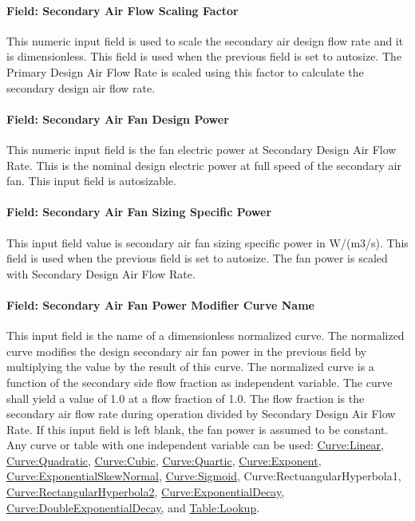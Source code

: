 \paragraph{Field: Secondary Air Flow Scaling Factor}\label{field-secondary-air-flow-scaling-factor}

This numeric input field is used to scale the secondary air design flow rate and it is dimensionless. This field is used when the previous field is set to autosize. The Primary Design Air Flow Rate is scaled using this factor to calculate the secondary design air flow rate.

\paragraph{Field: Secondary Air Fan Design Power}\label{field-secondary-air-fan-design-power}

This numeric input field is the fan electric power at Secondary Design Air Flow Rate. This is the nominal design electric power at full speed of the secondary air fan. This input field is autosizable.

\paragraph{Field: Secondary Air Fan Sizing Specific Power}\label{field-secondary-air-fan-sizing-specific-power}

This input field value is secondary air fan sizing specific power in W/(m3/s). This field is used when the previous field is set to autosize. The fan power is scaled with Secondary Design Air Flow Rate.

\paragraph{Field: Secondary Air Fan Power Modifier Curve Name}\label{field-secondary-air-fan-power-modifier-curve-name}

This input field is the name of a dimensionless normalized curve. The normalized curve modifies the design secondary air fan power in the previous field by multiplying the value by the result of this curve. The normalized curve is a function of the secondary side flow fraction as independent variable. The curve shall yield a value of 1.0 at a flow fraction of 1.0. The flow fraction is the secondary air flow rate during operation divided by Secondary Design Air Flow Rate. If this input field is left blank, the fan power is assumed to be constant. Any curve or table with one independent variable can be used: \hyperref[curvelinear]{Curve:Linear}, \hyperref[curvequadratic]{Curve:Quadratic}, \hyperref[curvecubic]{Curve:Cubic}, \hyperref[curvequartic]{Curve:Quartic}, \hyperref[curveexponent]{Curve:Exponent}, \hyperref[curveexponentialskewnormal]{Curve:ExponentialSkewNormal}, \hyperref[curvesigmoid]{Curve:Sigmoid}, Curve:RectuangularHyperbola1, \hyperref[curverectangularhyperbola2]{Curve:RectangularHyperbola2}, \hyperref[curveexponentialdecay]{Curve:ExponentialDecay}, \hyperref[curvedoubleexponentialdecay]{Curve:DoubleExponentialDecay}, and \hyperref[tablelookup]{Table:Lookup}.

